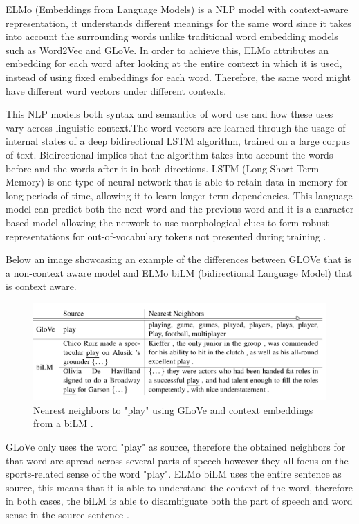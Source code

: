             \par ELMo (Embeddings from Language Models) is a NLP model with context-aware representation, it understands different meanings for the same word since it takes into account the surrounding words unlike traditional word embedding models such as Word2Vec and GLoVe. In order to achieve this, ELMo attributes an embedding for each word after looking at the entire context in which it is used, instead of using fixed embeddings for each word. Therefore, the same word might have different word vectors under different contexts.
            \par This NLP models both syntax and semantics of word use and how these uses vary across linguistic context.The word vectors are learned through the usage of internal states of a deep bidirectional LSTM algorithm, trained on a large corpus of text. Bidirectional implies that the algorithm takes into account the words before and the words after it in both directions. LSTM (Long Short-Term Memory) is one type of neural network that is able to retain data in memory for long periods of time, allowing it to learn longer-term dependencies.
            This language model can predict both the next word and the previous word and it is a character based model allowing the network to use morphological clues to form robust representations for out-of-vocabulary tokens not presented during training \cite{Peters:2018}.
            \par Below an image showcasing an example of the differences between GLOVe that is a non-context aware model and ELMo biLM (bidirectional Language Model) that is context aware.

            
        \begin{figure}[htb]
            \centering
            \includegraphics[scale = 0.3]{Sections/3StateOfTheArt/3_images/ELMO.png}
            \caption{Nearest neighbors to "play" using GLoVe and context embeddings from a biLM \cite{Peters:2018}.} 
        \end{figure}

        \par GLoVe only uses the word "play" as source, therefore the obtained neighbors for that word are spread across several parts of speech however they all focus on the sports-related sense of the word "play". ELMo biLM uses the entire sentence as source, this means that it is able to understand the context of the word, therefore in both cases, the biLM is able to disambiguate both the part of speech and word sense in the source sentence \cite{Peters:2018}.
        

